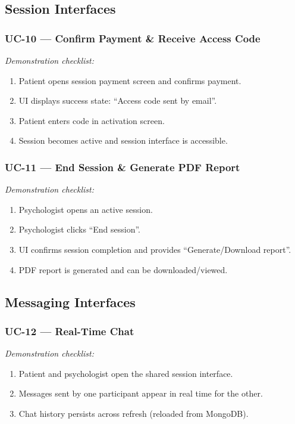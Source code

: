 \documentclass[12pt]{article}
\begin{document}
\subsection{Session Interfaces}
\subsubsection*{UC-10 --- Confirm Payment \& Receive Access Code}
\textit{Demonstration checklist:}
\begin{enumerate}[leftmargin=*]
  \item Patient opens session payment screen and confirms payment.
  \item UI displays success state: ``Access code sent by email''.
  \item Patient enters code in activation screen.
  \item Session becomes active and session interface is accessible.
\end{enumerate}

\subsubsection*{UC-11 --- End Session \& Generate PDF Report}
\textit{Demonstration checklist:}
\begin{enumerate}[leftmargin=*]
  \item Psychologist opens an active session.
  \item Psychologist clicks ``End session''.
  \item UI confirms session completion and provides ``Generate/Download report''.
  \item PDF report is generated and can be downloaded/viewed.
\end{enumerate}

\subsection{Messaging Interfaces}
\subsubsection*{UC-12 --- Real-Time Chat}
\textit{Demonstration checklist:}
\begin{enumerate}[leftmargin=*]
  \item Patient and psychologist open the shared session interface.
  \item Messages sent by one participant appear in real time for the other.
  \item Chat history persists across refresh (reloaded from MongoDB).
\end{enumerate}
\end{document}
